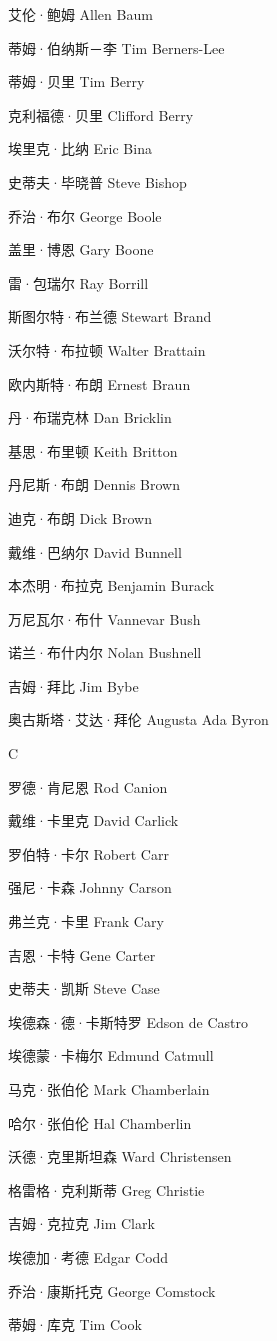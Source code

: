 \documentclass[12pt,UTF8]{ctexbook}
\begin{document}
艾伦·鲍姆 Allen Baum

蒂姆·伯纳斯－李 Tim Berners-Lee

蒂姆·贝里 Tim Berry

克利福德·贝里 Clifford Berry

埃里克·比纳 Eric Bina

史蒂夫·毕晓普 Steve Bishop

乔治·布尔 George Boole

盖里·博恩 Gary Boone

雷·包瑞尔 Ray Borrill

斯图尔特·布兰德 Stewart Brand

沃尔特·布拉顿 Walter Brattain

欧内斯特·布朗 Ernest Braun

丹·布瑞克林 Dan Bricklin

基思·布里顿 Keith Britton

丹尼斯·布朗 Dennis Brown

迪克·布朗 Dick Brown

戴维·巴纳尔 David Bunnell

本杰明·布拉克 Benjamin Burack

万尼瓦尔·布什 Vannevar Bush

诺兰·布什内尔 Nolan Bushnell

吉姆·拜比 Jim Bybe

奥古斯塔·艾达·拜伦 Augusta Ada Byron

C

罗德·肯尼恩 Rod Canion

戴维·卡里克 David Carlick

罗伯特·卡尔 Robert Carr

强尼·卡森 Johnny Carson

弗兰克·卡里 Frank Cary

吉恩·卡特 Gene Carter

史蒂夫·凯斯 Steve Case

埃德森·德·卡斯特罗 Edson de Castro

埃德蒙·卡梅尔 Edmund Catmull

马克·张伯伦 Mark Chamberlain

哈尔·张伯伦 Hal Chamberlin

沃德·克里斯坦森 Ward Christensen

格雷格·克利斯蒂 Greg Christie

吉姆·克拉克 Jim Clark

埃德加·考德 Edgar Codd

乔治·康斯托克 George Comstock

蒂姆·库克 Tim Cook
\end{document}
